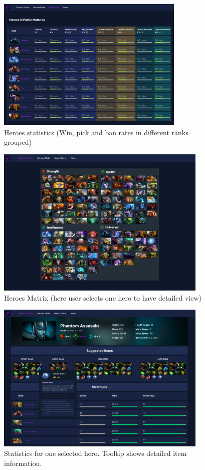     \begin{figure}[ht]
        \centering
        \includegraphics[width=0.8\textwidth]{images/HeroStats}
        \caption{Heroes statistics (Win, pick and ban rates in different ranks grouped)}
    \end{figure}

    \begin{figure}[ht]
        \centering
        \includegraphics[width=0.9\textwidth]{images/HeroMatrix}
        \caption{Heroes Matrix (here user selects one hero to have detailed view)}
    \end{figure}

    \begin{figure}[ht]
        \centering
        \includegraphics[width=0.9\textwidth]{images/SelectedHero}
        \caption{Statistics for one selected hero. Tooltip shows detailed item information.}
    \end{figure}

